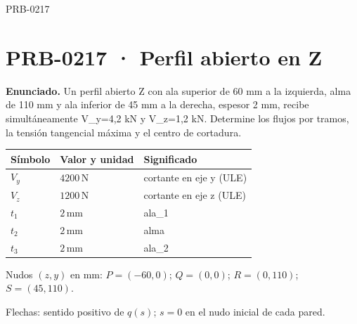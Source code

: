 \begin{studiumworked}{PRB-0217}

\section{PRB-0217 · Perfil abierto en Z}

\textbf{Enunciado.} Un perfil abierto Z con ala superior de 60 mm a la izquierda, alma de 110 mm y ala inferior de 45 mm a la derecha, espesor 2 mm, recibe simultáneamente V\_y=4,2 kN y V\_z=1,2 kN. Determine los flujos por tramos, la tensión tangencial máxima y el centro de cortadura.

\par\medskip\noindent\begin{tabular}{@{}p{.18\linewidth}p{.26\linewidth}p{.48\linewidth}@{}}
\toprule Símbolo & Valor y unidad & Significado\\\midrule
$V_{y}$ & $4200\,\mathrm{N}$ & cortante en eje y (ULE)\\
$V_{z}$ & $1200\,\mathrm{N}$ & cortante en eje z (ULE)\\
$t_{1}$ & $2\,\mathrm{mm}$ & ala\_1\\
$t_{2}$ & $2\,\mathrm{mm}$ & alma\\
$t_{3}$ & $2\,\mathrm{mm}$ & ala\_2\\
\bottomrule\end{tabular}\par\medskip

\par\medskip\noindent\begin{minipage}{\linewidth}\centering
{}
\par\small Nudos $(z,y)$ en mm: $P=(-60,0)$; $Q=(0,0)$; $R=(0,110)$; $S=(45,110)$.
\par\small Flechas: sentido positivo de $q(s)$; $s=0$ en el nudo inicial de cada pared.
\par\normalsize\end{minipage}\par\medskip


\end{studiumworked}
